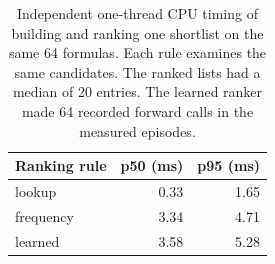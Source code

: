 \begin{table}[!htbp]\centering\small\setlength{\tabcolsep}{3.6pt}
\caption{Independent one-thread CPU timing of building and ranking one shortlist on the same 64 formulas. Each rule examines the same candidates. The ranked lists had a median of 20 entries. The learned ranker made 64 recorded forward calls in the measured episodes.}
\begin{tabular}{lrr}\hline
Ranking rule & p50 (ms) & p95 (ms)\\\hline
lookup & 0.33 & 1.65\\
frequency & 3.34 & 4.71\\
learned & 3.58 & 5.28\\
\hline\end{tabular}\end{table}
